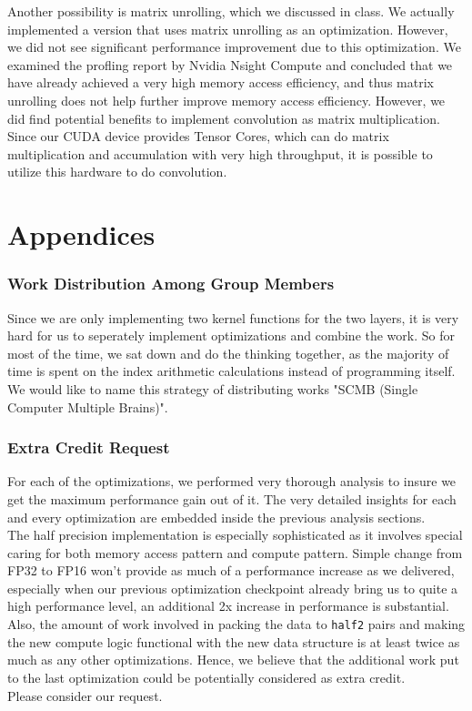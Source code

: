 \documentclass{article}
\begin{document}
Another possibility is matrix unrolling, which we discussed in class. We actually
implemented a version that uses matrix unrolling as an optimization. However, we did
not see significant performance improvement due to this optimization. We examined
the profling report by Nvidia Nsight Compute and concluded that we have already
achieved a very high memory access efficiency, and thus matrix unrolling does not
help further improve memory access efficiency. However, we did find potential
benefits to implement convolution as matrix multiplication. Since our CUDA device
provides Tensor Cores, which can do matrix multiplication and accumulation with very
high throughput, it is possible to utilize this hardware to do convolution.

\part*{Appendices}
\setcounter{section}{0}

\section{Work Distribution Among Group Members}
Since we are only implementing two kernel functions for the two layers, it is very
hard for us to seperately implement optimizations and combine the work. So for most
of the time, we sat down and do the thinking together, as the majority of time
is spent on the index arithmetic calculations instead of programming itself.
We would like to name this strategy of distributing works "SCMB (Single Computer
Multiple Brains)".

\section{Extra Credit Request}
For each of the optimizations, we performed very thorough analysis to insure we
get the maximum performance gain out of it. The very detailed insights for each and every
optimization are embedded inside the previous analysis sections.\\

The half precision
implementation is especially sophisticated as it involves special caring for both
memory access pattern and compute pattern. Simple change from FP32 to FP16 won't
provide as much of a performance increase as we delivered, especially when our previous
optimization checkpoint already bring us to quite a high performance level, an additional 2x increase
in performance is substantial. Also, the amount of work involved in packing the
data to \verb|half2| pairs and making the new compute logic functional with the new
data structure is at least twice as much as any other optimizations. Hence, we believe that
the additional work put to the last optimization could be potentially considered as
extra credit.\\

Please consider our request.
\end{document}
